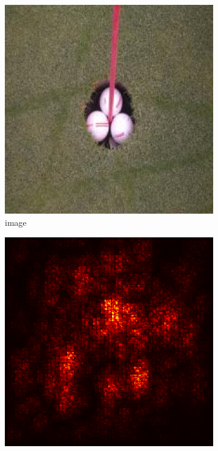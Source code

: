 \documentclass[preprint,12pt]{elsarticle}
\begin{document}
\begin{figure}
    \centering
    \begin{subfigure}{0.14\linewidth}
        \centering
        \includegraphics[width=\linewidth]{../visualizations/examples/imagenette/cnn/images/5.png}
        \caption{image}
    \end{subfigure}
    \hfill
    \begin{subfigure}{0.14\linewidth}
        \centering
        \includegraphics[width=\linewidth]{../visualizations/examples/imagenette/cnn/saliency_map/5.png}

\end{subfigure}
\end{figure}
\end{document}
